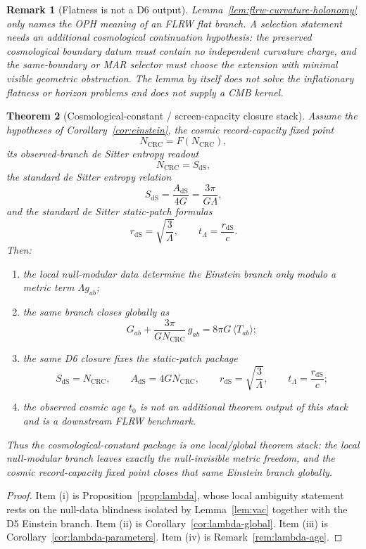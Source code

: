 \documentclass[11pt]{article}
\newtheorem{theorem}{Theorem}[section]
\newtheorem{remark}[theorem]{Remark}
\begin{document}
\begin{remark}[Flatness is not a D6 output]\label{rem:flrw-holonomy-boundary}
Lemma~\ref{lem:flrw-curvature-holonomy} only names the OPH meaning of an FLRW flat branch. A
selection statement needs an additional cosmological continuation hypothesis: the preserved
cosmological boundary datum must contain no independent curvature charge, and the same-boundary or
MAR selector must choose the extension with minimal visible geometric obstruction. The lemma by
itself does not solve the inflationary flatness or horizon problems and does not supply a CMB
kernel.
\end{remark}

\begin{theorem}[Cosmological-constant / screen-capacity closure stack]\label{thm:lambda-stack}
Assume the hypotheses of Corollary~\ref{cor:einstein}, the cosmic record-capacity fixed point
\[
N_{\mathrm{CRC}}=F(N_{\mathrm{CRC}}),
\]
its observed-branch de Sitter entropy readout
\[
N_{\mathrm{CRC}}=S_{\mathrm{dS}},
\]
\noindent the standard de Sitter entropy relation
\[
S_{\mathrm{dS}}=\frac{A_{\mathrm{dS}}}{4G}=\frac{3\pi}{G\Lambda},
\]
and the standard de Sitter static-patch formulas
\[
r_{\mathrm{dS}}=\sqrt{\frac{3}{\Lambda}},
\qquad
t_\Lambda=\frac{r_{\mathrm{dS}}}{c}.
\]
Then:
\begin{enumerate}[label=\textup{(\roman*)},leftmargin=2em]
\item the local null-modular data determine the Einstein branch only modulo a metric term \(\Lambda g_{ab}\);
\item the same branch closes globally as
\[
G_{ab}+\frac{3\pi}{G N_{\mathrm{CRC}}}\,g_{ab}=8\pi G\,\langle T_{ab}\rangle;
\]
\item the same D6 closure fixes the static-patch package
\[
S_{\mathrm{dS}}=N_{\mathrm{CRC}},
\qquad
A_{\mathrm{dS}}=4G N_{\mathrm{CRC}},
\qquad
r_{\mathrm{dS}}=\sqrt{\frac{3}{\Lambda}},
\qquad
t_\Lambda=\frac{r_{\mathrm{dS}}}{c};
\]
\item the observed cosmic age \(t_0\) is not an additional theorem output of this stack and is a downstream FLRW benchmark.
\end{enumerate}
Thus the cosmological-constant package is one local/global theorem stack: the local null-modular branch leaves exactly the null-invisible metric freedom, and the cosmic record-capacity fixed point closes that same Einstein branch globally.
\end{theorem}

\begin{proof}
Item \textup{(i)} is Proposition~\ref{prop:lambda}, whose local ambiguity statement rests on the null-data blindness isolated by Lemma~\ref{lem:vac} together with the D5 Einstein branch. Item \textup{(ii)} is Corollary~\ref{cor:lambda-global}. Item \textup{(iii)} is Corollary~\ref{cor:lambda-parameters}. Item \textup{(iv)} is Remark~\ref{rem:lambda-age}.
\end{proof}
\end{document}
